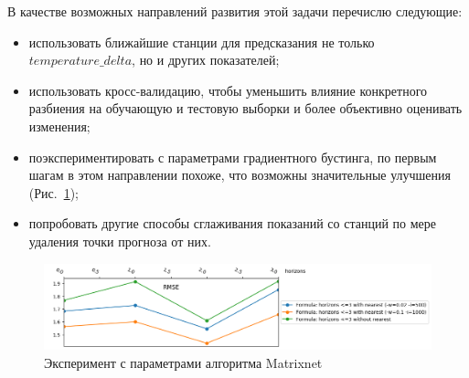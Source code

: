 \documentclass[14pt]{matmex-diploma}
\begin{document}
В качестве возможных направлений развития этой задачи перечислю следующие:
\begin{itemize}
    \item использовать ближайшие станции для предсказания не только $temperature\_delta$, но и других показателей;
    \item использовать кросс-валидацию, чтобы уменьшить влияние конкретного разбиения на обучающую и тестовую выборки и более объективно оценивать изменения;
    \item поэкспериментировать с параметрами градиентного бустинга, по первым шагам в этом направлении похоже, что возможны значительные улучшения (Рис.~\ref{pic4_params});
    \item попробовать другие способы сглаживания показаний со станций по мере удаления точки прогноза от них. 
\end{itemize}


\begin{figure}
\centering
\includegraphics[width=\linewidth]{images/pic4_params.png}
\caption{Эксперимент с параметрами алгоритма Matrixnet}
\label{pic4_params}
\end{figure}


\setmonofont[Mapping=tex-text]{CMU Typewriter Text}

 
\end{document}
